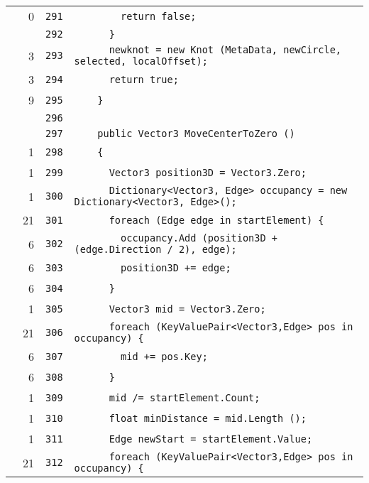\documentclass[a4paper,10pt]{article}
\begin{document}
\begin{longtable}[l]{lrrl}
\cellcolor{red} & 0 & \verb~291~ & \verb~        return false;~\\
\cellcolor{gray} &  & \verb~292~ & \verb~      }~\\
\cellcolor{green} & 3 & \verb~293~ & \verb~      newknot = new Knot (MetaData, newCircle, selected, localOffset);~\\
\cellcolor{green} & 3 & \verb~294~ & \verb~      return true;~\\
\cellcolor{green} & 9 & \verb~295~ & \verb~    }~\\
\cellcolor{gray} &  & \verb~296~ & \verb~~\\
\cellcolor{gray} &  & \verb~297~ & \verb~    public Vector3 MoveCenterToZero ()~\\
\cellcolor{green} & 1 & \verb~298~ & \verb~    {~\\
\cellcolor{green} & 1 & \verb~299~ & \verb~      Vector3 position3D = Vector3.Zero;~\\
\cellcolor{green} & 1 & \verb~300~ & \verb~      Dictionary<Vector3, Edge> occupancy = new Dictionary<Vector3, Edge>();~\\
\cellcolor{green} & 21 & \verb~301~ & \verb~      foreach (Edge edge in startElement) {~\\
\cellcolor{green} & 6 & \verb~302~ & \verb~        occupancy.Add (position3D + (edge.Direction / 2), edge);~\\
\cellcolor{green} & 6 & \verb~303~ & \verb~        position3D += edge;~\\
\cellcolor{green} & 6 & \verb~304~ & \verb~      }~\\
\cellcolor{green} & 1 & \verb~305~ & \verb~      Vector3 mid = Vector3.Zero;~\\
\cellcolor{green} & 21 & \verb~306~ & \verb~      foreach (KeyValuePair<Vector3,Edge> pos in occupancy) {~\\
\cellcolor{green} & 6 & \verb~307~ & \verb~        mid += pos.Key;~\\
\cellcolor{green} & 6 & \verb~308~ & \verb~      }~\\
\cellcolor{green} & 1 & \verb~309~ & \verb~      mid /= startElement.Count;~\\
\cellcolor{green} & 1 & \verb~310~ & \verb~      float minDistance = mid.Length ();~\\
\cellcolor{green} & 1 & \verb~311~ & \verb~      Edge newStart = startElement.Value;~\\
\cellcolor{green} & 21 & \verb~312~ & \verb~      foreach (KeyValuePair<Vector3,Edge> pos in occupancy) {~\\

\end{longtable}
\end{document}
